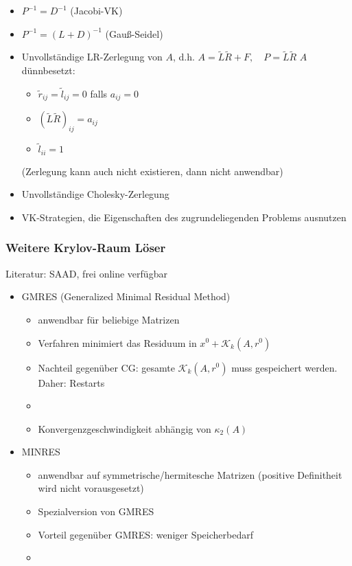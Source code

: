 \begin{itemize}
  \item $P^{-1} = D^{-1}$ (Jacobi-VK)
  \item $P^{-1} = (L + D)^{-1}$ (Gauß-Seidel)
  \item Unvollständige LR-Zerlegung von $A$, d.h. $A = \tilde{L}\tilde{R} + F, \quad P = \tilde{L}\tilde{R}$ $A$ dünnbesetzt:
    \begin{itemize}
      \item $\tilde{r}_{ij} = \tilde{l}_{ij} = 0$ falls $a_{ij} = 0$
      \item $(\tilde{L}\tilde{R})_{ij} = a_{ij}$
      \item $\tilde{l}_{ii} = 1$
    \end{itemize}
    (Zerlegung kann auch nicht existieren, dann nicht anwendbar)\\
  \item Unvollständige Cholesky-Zerlegung 
  \item VK-Strategien, die Eigenschaften des zugrundeliegenden Problems ausnutzen
\end{itemize}

\subsubsection{Weitere Krylov-Raum Löser}
Literatur: SAAD, frei online verfügbar
\begin{itemize}
  \item GMRES (Generalized Minimal Residual Method)
    \begin{itemize}
      \item anwendbar für beliebige Matrizen
      \item Verfahren minimiert das Residuum in $x^0 + \mathcal{K}_k(A,r^0)$
      \item Nachteil gegenüber CG: gesamte $\mathcal{K}_k(A,r^0)$ muss gespeichert werden. Daher: Restarts
      \item {}
      \item Konvergenzgeschwindigkeit abhängig von $\kappa_2(A)$
    \end{itemize}
  \item MINRES
    \begin{itemize}
      \item anwendbar auf symmetrische/hermitesche Matrizen (positive Definitheit wird nicht vorausgesetzt)
      \item Spezialversion von GMRES
      \item Vorteil gegenüber GMRES: weniger Speicherbedarf
      \item {}
    \end{itemize}
\end{itemize}















